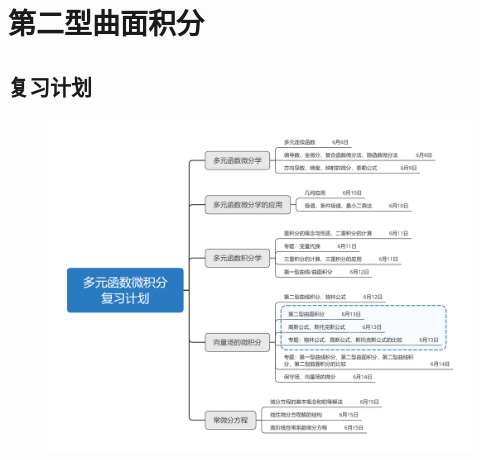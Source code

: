 \documentclass[12pt,UTF8,fleqn]{ctexart}
\begin{document}
\setcounter{section}{10}
\section{第二型曲面积分}
\noindent
\subsection{复习计划}
\begin{figure}[H]
\begin{center}
\includegraphics[height=0.5\textheight]{Figures20190613/plan.png}
\end{center}
\end{figure}
\end{document}
